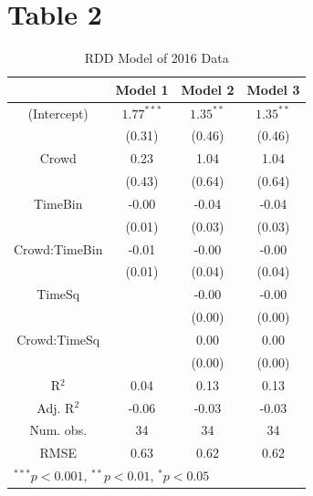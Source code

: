 \documentclass{article}
\begin{document}
\section*{Table 2}
\begin{table}[hb!]
\begin{center}
\begin{tabular}{c|c|c|c|}
\toprule
 & \multicolumn{1}{c}{Model 1} & \multicolumn{1}{c}{Model 2} & \multicolumn{1}{c}{Model 3} \\
\midrule
(Intercept)   & $1.77^{***}$ & $1.35^{**}$ & $1.35^{**}$ \\
              & (0.31)     & (0.46)    & (0.46)    \\
Crowd         & 0.23       & 1.04      & 1.04      \\
              & (0.43)     & (0.64)    & (0.64)    \\
TimeBin       & -0.00      & -0.04     & -0.04     \\
              & (0.01)     & (0.03)    & (0.03)    \\
Crowd:TimeBin & -0.01      & -0.00     & -0.00     \\
              & (0.01)     & (0.04)    & (0.04)    \\
TimeSq        &            & -0.00     & -0.00     \\
              &            & (0.00)    & (0.00)    \\
Crowd:TimeSq  &            & 0.00      & 0.00      \\
              &            & (0.00)    & (0.00)    \\
\midrule
R$^2$         & 0.04       & 0.13      & 0.13      \\
Adj. R$^2$    & -0.06      & -0.03     & -0.03     \\
Num. obs.     & 34         & 34        & 34        \\
RMSE          & 0.63       & 0.62      & 0.62      \\
\bottomrule
\multicolumn{4}{l}{\scriptsize{$^{***}p<0.001$, $^{**}p<0.01$, $^*p<0.05$}}
\end{tabular}
\caption{RDD Model of 2016 Data}
\label{tab:3}
\end{center}
\end{table}
\end{document}
